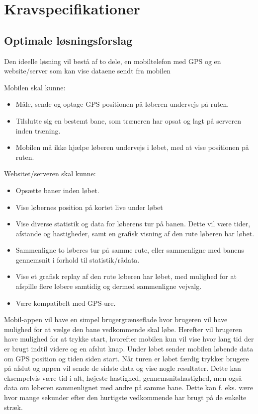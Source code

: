\chapter{Kravspecifikationer}

\section{Optimale løsningsforslag}
Den ideelle løsning vil bestå af to dele, en mobiltelefon med GPS og en website/server som kan vise dataene sendt fra mobilen

Mobilen skal kunne:
\begin{itemize}
\item Måle, sende og optage GPS positionen på løberen undervejs på ruten.
\item Tilslutte sig en bestemt bane, som træneren har opsat og lagt på serveren inden træning.
\item Mobilen må ikke hjælpe løberen undervejs i løbet, med at vise positionen på ruten.
\end{itemize}

Websitet/serveren skal kunne:
\begin{itemize}
\item Opsætte baner inden løbet.
\item Vise løbernes position på kortet live under løbet
\item Vise diverse statistik og data for løberens tur på banen. Dette vil være tider, afstande og hastigheder, samt en grafisk visning af den rute løberen har løbet.
\item Sammenligne to løberes tur på samme rute, eller sammenligne med banens gennemsnit i forhold til statistik/rådata.
\item Vise et grafisk replay af den rute løberen har løbet, med mulighed for at afspille flere løbere samtidig og dermed sammenligne vejvalg.
\item Være kompatibelt med GPS-ure.
\end{itemize} 

Mobil-appen vil have en simpel brugergrænseflade hvor brugeren vil have mulighed for at vælge den bane vedkommende skal løbe. Herefter vil brugeren have mulighed for at trykke start, hvorefter mobilen kun vil vise hvor lang tid der er brugt indtil videre og en afslut knap. Under løbet sender mobilen løbende data om GPS position og tiden siden start. Når turen er løbet færdig trykker brugere på afslut og appen vil sende de sidste data og vise nogle resultater. Dette kan eksempelvis være tid i alt, højeste hastighed, gennemsnitshastighed, men også data om løberen sammenlignet med andre på samme bane. Dette kan f. eks. være hvor mange sekunder efter den hurtigste vedkommende har brugt på de enkelte stræk.

